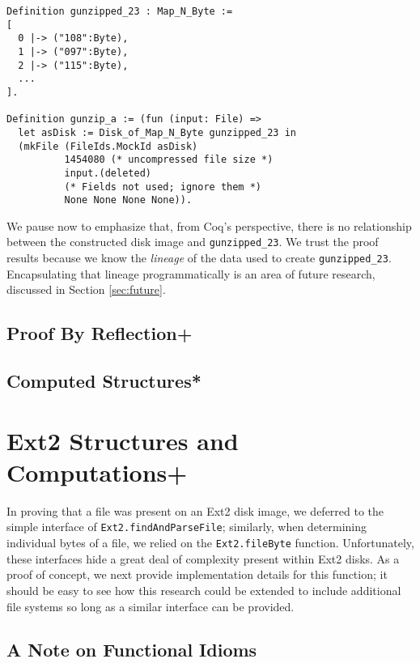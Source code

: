 \documentclass[nocopyrightspace]{sigplanconf}
\begin{document}
\begin{lstlisting}
Definition gunzipped_23 : Map_N_Byte := 
[ 
  0 |-> ("108":Byte), 
  1 |-> ("097":Byte), 
  2 |-> ("115":Byte), 
  ...
].

Definition gunzip_a := (fun (input: File) => 
  let asDisk := Disk_of_Map_N_Byte gunzipped_23 in
  (mkFile (FileIds.MockId asDisk)
          1454080 (* uncompressed file size *)
          input.(deleted) 
          (* Fields not used; ignore them *)
          None None None None)).
\end{lstlisting}

We pause now to emphasize that, from Coq's perspective, there is no
relationship between the constructed disk image and {\tt gunzipped\_23}. We
trust the proof results because we know the {\em lineage} of the data used to
create {\tt gunzipped\_23}. Encapsulating that lineage programmatically is an
area of future research, discussed in Section \ref{sec:future}.

\subsection{Proof By Reflection+}
\label{subsec:reflection}

\subsection{Computed Structures*}

\section{Ext2 Structures and Computations+}

In proving that a file was present on an Ext2 disk image, we deferred to the
simple interface of {\tt Ext2.findAndParseFile}; similarly, when determining
individual bytes of a file, we relied on the {\tt Ext2.fileByte} function.
Unfortunately, these interfaces hide a great deal of complexity present within
Ext2 disks. As a proof of concept, we next provide implementation details for
this function; it should be easy to see how this research could be extended to
include additional file systems so long as a similar interface can be
provided.

\subsection{A Note on Functional Idioms}
\label{subsec:functionalext2}
\end{document}
